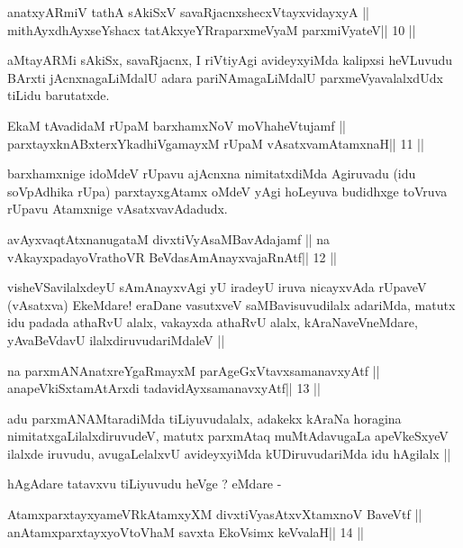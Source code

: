 \begin{shl}
anatxyARmiV tathA sAkiSxV savaRjacnxshecxVtayxvidayxyA ||
mithAyxdhAyxseYshacx tatAkxyeYRraparxmeVyaM parxmiVyateV\hfill || 10 ||
\end{shl}

\begin{artha}
aMtayARMi sAkiSx, savaRjacnx, I riVtiyAgi avideyxyiMda kalipxsi
heVLuvudu BArxti jAcnxnagaLiMdalU adara pariNAmagaLiMdalU
parxmeVyavalalxdUdx tiLidu barutatxde.
\end{artha}

\begin{shl}
EkaM tAvadidaM rUpaM barxhamxNoV moVhaheVtujamf ||
parxtayxknABxterxYkadhiVgamayxM rUpaM vAsatxvamAtamxnaH\hfill || 11 ||
\end{shl}

\begin{artha}
barxhamxnige idoMdeV rUpavu ajAcnxna nimitatxdiMda Agiruvadu (idu
soVpAdhika rUpa) parxtayxgAtamx oMdeV yAgi hoLeyuva budidhxge toVruva
rUpavu Atamxnige vAsatxvavAdadudx.
\end{artha}

\begin{shl}
avAyxvaqtAtxnanugataM divxtiVyAsaMBavAdajamf ||
na vAkayxpadayoVrathoVR BeVdasAmAnayxvajaRnAtf\hfill || 12 ||
\end{shl}

\begin{artha}
visheVSavilalxdeyU sAmAnayxvAgi yU iradeyU iruva nicayxvAda rUpaveV
(vAsatxva) EkeMdare! eraDane vasutxveV saMBavisuvudilalx adariMda,
matutx idu padada athaRvU alalx, vakayxda athaRvU alalx,
kAraNaveVneMdare, yAvaBeVdavU ilalxdiruvudariMdaleV ||
\end{artha}

\begin{shl}
na parxmANAnatxreYgaRmayxM parAgeGxVtavxsamanavxyAtf ||
anapeVkiSxtamAtArxdi tadavidAyxsamanavxyAtf\hfill || 13 ||
\end{shl}

\begin{artha}
adu parxmANAMtaradiMda tiLiyuvudalalx, adakekx kAraNa horagina
nimitatxgaLilalxdiruvudeV, matutx parxmAtaq muMtAdavugaLa apeVkeSxyeV
ilalxde iruvudu, avugaLelalxvU avideyxyiMda kUDiruvudariMda idu
hAgilalx ||

hAgAdare tatavxvu tiLiyuvudu heVge ? eMdare -
\end{artha}

\begin{shl}
AtamxparxtayxyameVRkAtamxyXM divxtiVyasAtxvXtamxnoV BaveVtf ||
anAtamxparxtayxyoV\s toV\s haM savxta EkoV\s simx keVvalaH\hfill || 14 ||
\end{shl}

